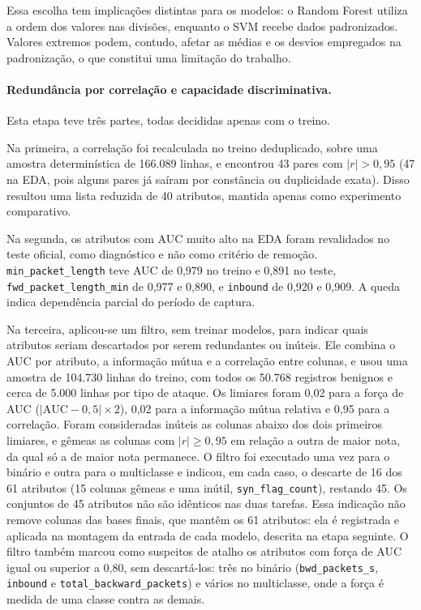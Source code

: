 \documentclass[
    12pt,                %
    openright,           %
    oneside,             %
    a4paper,             %
    english,             %
    brazil               %
]{abntex2}
\begin{document}
Essa escolha tem implicações distintas para os modelos: o Random Forest utiliza a ordem dos valores nas divisões, enquanto o SVM recebe dados padronizados. Valores extremos podem, contudo, afetar as médias e os desvios empregados na padronização, o que constitui uma limitação do trabalho.

\paragraph{Redundância por correlação e capacidade discriminativa.}
Esta etapa teve três partes, todas decididas apenas com o treino.

Na primeira, a correlação foi recalculada no treino deduplicado, sobre uma amostra determinística de 166.089 linhas, e encontrou 43 pares com $|r| > 0{,}95$ (47 na EDA, pois alguns pares já saíram por constância ou duplicidade exata). Disso resultou uma lista reduzida de 40 atributos, mantida apenas como experimento comparativo.

Na segunda, os atributos com AUC muito alto na EDA foram revalidados no teste oficial, como diagnóstico e não como critério de remoção. \texttt{min\_packet\_length} teve AUC de 0,979 no treino e 0,891 no teste, \texttt{fwd\_packet\_length\_min} de 0,977 e 0,890, e \texttt{inbound} de 0,920 e 0,909. A queda indica dependência parcial do período de captura.

Na terceira, aplicou-se um filtro, sem treinar modelos, para indicar quais atributos seriam descartados por serem redundantes ou inúteis. Ele combina o AUC por atributo, a informação mútua e a correlação entre colunas, e usou uma amostra de 104.730 linhas do treino, com todos os 50.768 registros benignos e cerca de 5.000 linhas por tipo de ataque. Os limiares foram 0,02 para a força de AUC ($|\mathrm{AUC} - 0{,}5| \times 2$), 0,02 para a informação mútua relativa e 0,95 para a correlação. Foram consideradas inúteis as colunas abaixo dos dois primeiros limiares, e gêmeas as colunas com $|r| \geq 0{,}95$ em relação a outra de maior nota, da qual só a de maior nota permanece. O filtro foi executado uma vez para o binário e outra para o multiclasse e indicou, em cada caso, o descarte de 16 dos 61 atributos (15 colunas gêmeas e uma inútil, \texttt{syn\_flag\_count}), restando 45. Os conjuntos de 45 atributos não são idênticos nas duas tarefas. Essa indicação não remove colunas das bases finais, que mantêm os 61 atributos: ela é registrada e aplicada na montagem da entrada de cada modelo, descrita na etapa seguinte. O filtro também marcou como suspeitos de atalho os atributos com força de AUC igual ou superior a 0,80, sem descartá-los: três no binário (\texttt{bwd\_packets\_s}, \texttt{inbound} e \texttt{total\_backward\_packets}) e vários no multiclasse, onde a força é medida de uma classe contra as demais.
\end{document}
